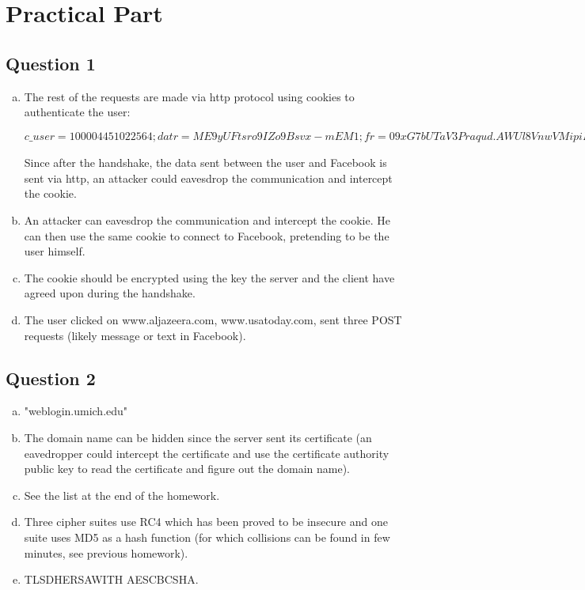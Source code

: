 \documentclass{article}
\begin{document}
\section{Practical Part}
\subsection{Question 1}
\begin{enumerate}[(a)]
\item The rest of the requests are made via http protocol using cookies to authenticate the user:

 $c\_user=100004451022564; datr=ME9yUFtsro9IZo9Bsvx-mEM1; fr=09xG7bUTaV3Praqud.AWUl8VnwVMipiKyhdelnR_ylYXM.BQck9L.mh.AWUmDU8q; lu=Rhm1BbpziSYpwQr9lOfxnanw; xs=61\%3ATYLvVr8P4xXmM\%3A0\%3A1349668683; sub=3; p=68; wd=1366x643;$

 
Since after the handshake, the data sent between the user and Facebook is sent via http, an attacker could eavesdrop the communication and intercept the cookie.
\item An attacker can eavesdrop the communication and intercept the cookie. He can then use the same cookie to connect to Facebook, pretending to be the user himself. 
\item The cookie should be encrypted using the key the server and the client have agreed upon during the handshake.
\item The user clicked on www.aljazeera.com, www.usatoday.com, sent three POST requests (likely message or text in Facebook).
\end{enumerate}

\subsection{Question 2}

\begin{enumerate}[(a)]
	\item "weblogin.umich.edu" 
	\item The domain name can be hidden since the server sent its certificate (an eavedropper could intercept the certificate and use the certificate authority public key to read the certificate and figure out the domain name). 
	\item See the list at the end of the homework.
	\item Three cipher suites use RC4 which has been proved to be insecure and one suite uses MD5 as a hash function (for which collisions can be found in few minutes, see previous homework).
	\item TLS\textunderscore DHE\textunderscore RSA\textunderscore WITH \textunderscore AES\textunderscore CBC\textunderscore SHA.
\end{enumerate}
\end{document}

